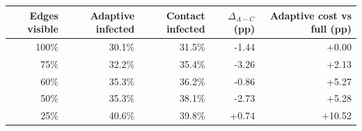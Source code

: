 \begin{tabular}{rrrrr}
\toprule
Edges visible & Adaptive infected & Contact infected & $\Delta_{A-C}$ (pp) & Adaptive cost vs full (pp) \\
\midrule
100\% & 30.1\% & 31.5\% & -1.44 & +0.00 \\
75\% & 32.2\% & 35.4\% & -3.26 & +2.13 \\
60\% & 35.3\% & 36.2\% & -0.86 & +5.27 \\
50\% & 35.3\% & 38.1\% & -2.73 & +5.28 \\
25\% & 40.6\% & 39.8\% & +0.74 & +10.52 \\
\bottomrule
\end{tabular}
